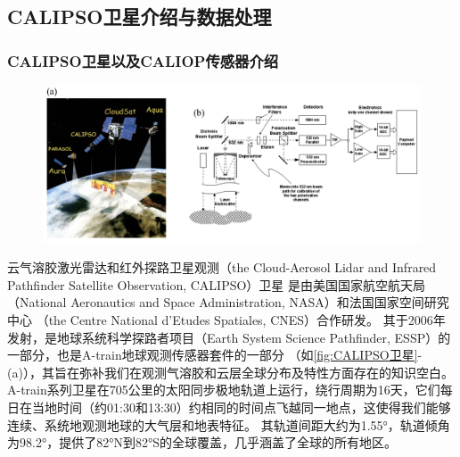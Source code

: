 \subsection{CALIPSO卫星介绍与数据处理}
\subsubsection{CALIPSO卫星以及CALIOP传感器介绍}
\begin{figure}[htbp]
    \centering
    \includegraphics[width=\linewidth]{figure/第二章用图/图2-CALIPSO.jpg}
\end{figure}

云气溶胶激光雷达和红外探路卫星观测（the Cloud-Aerosol Lidar and Infrared Pathfinder Satellite Observation, CALIPSO）卫星
是由美国国家航空航天局（National Aeronautics and Space Administration, NASA）和法国国家空间研究中心
（the Centre National d’Etudes Spatiales, CNES）合作研发\cite{winker2003accounting,CALIPSO_2009}。
其于2006年发射，是地球系统科学探路者项目（Earth System Science Pathfinder, ESSP）的一部分，也是A-train地球观测传感器套件的一部分
（如\autoref{fig:CALIPSO卫星}-(a)），其旨在弥补我们在观测气溶胶和云层全球分布及特性方面存在的知识空白\cite{CALIPSO_2009,winker2003accounting}。
A-train系列卫星在705公里的太阳同步极地轨道上运行，绕行周期为16天，它们每日在当地时间（约01:30和13:30）约相同的时间点飞越同一地点，这使得我们能够连续、系统地观测地球的大气层和地表特征。
其轨道间距大约为1.55°，轨道倾角为98.2°，提供了82°N到82°S的全球覆盖，几乎涵盖了全球的所有地区\cite{stephens2002cloudsat,CALIPSO_2009}。

